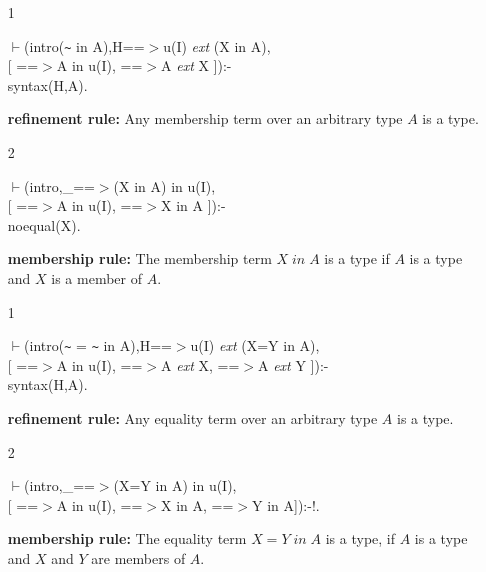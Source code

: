 \documentclass[11pt]{report}
\begin{document}
 \begin{enumerate}
 \item[1]
\begin{sf}\begin{tabbing}
$\vdash$(intro({\verb`~`} in A),H==$>$u(I) \mbox{\it ext} (X in A), \\[-0.15ex]
\hspace{2em}[ ==$>$A in u(I), ==$>$A \mbox{\it ext} X ]):-\\[-0.15ex]
\hspace{2em}syntax(H,A).
\end{tabbing}\end{sf}

 {\bf refinement rule:}
 Any membership term over an arbitrary type $A$ is a type. 
  
 \item[2]
\begin{sf}\begin{tabbing}
$\vdash$(intro,\_\hspace{0.1em}==$>$(X in A) in u(I), \\[-0.15ex]
\hspace{2em}[ ==$>$A in u(I), ==$>$X in A ]):-\\[-0.15ex]
\hspace{2em}noequal(X).
\end{tabbing}\end{sf}

 {\bf membership rule:}
 The membership term $X\;in\;A$ is a type if $A$ is a type and
 $X$ is a member of $A$.
 \item[1]
\begin{sf}\begin{tabbing}
$\vdash$(intro({\verb`~`} = {\verb`~`} in A),H==$>$u(I) \mbox{\it ext} (X=Y in A), \\[-0.15ex]
\hspace{2em}[ ==$>$A in u(I), ==$>$A \mbox{\it ext} X, ==$>$A \mbox{\it ext} Y ]):-\\[-0.15ex]
\hspace{2em}syntax(H,A).
\end{tabbing}\end{sf}

 {\bf refinement rule:}
 Any equality term over an arbitrary type $A$ is a type.
  
 \item[2]
\begin{sf}\begin{tabbing}
$\vdash$(intro,\_\hspace{0.1em}==$>$(X=Y in A) in u(I), \\[-0.15ex]
\hspace{2em}[ ==$>$A in u(I), ==$>$X in A, ==$>$Y in A]):-!.
\end{tabbing}\end{sf}

 {\bf membership rule:}
 The equality term $X=Y\;in\;A$ is a type, if $A$ is a type
 and $X$ and $Y$ are members of $A$.
 \end{enumerate}
  
\end{document}
